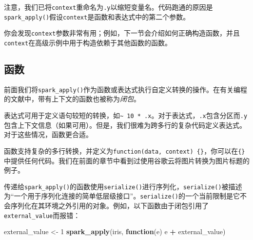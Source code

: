 \documentclass[
]{article}
\newenvironment{Shaded}{\begin{snugshade}}{\end{snugshade}}
\newcommand{\CommentTok}[1]{\textcolor[rgb]{0.56,0.35,0.01}{\textit{#1}}}
\newcommand{\ControlFlowTok}[1]{\textcolor[rgb]{0.13,0.29,0.53}{\textbf{#1}}}
\newcommand{\DataTypeTok}[1]{\textcolor[rgb]{0.13,0.29,0.53}{#1}}
\newcommand{\DecValTok}[1]{\textcolor[rgb]{0.00,0.00,0.81}{#1}}
\newcommand{\KeywordTok}[1]{\textcolor[rgb]{0.13,0.29,0.53}{\textbf{#1}}}
\newcommand{\NormalTok}[1]{#1}
\newcommand{\OperatorTok}[1]{\textcolor[rgb]{0.81,0.36,0.00}{\textbf{#1}}}
\newcommand{\StringTok}[1]{\textcolor[rgb]{0.31,0.60,0.02}{#1}}
\begin{document}
\begin{Shaded}
\end{Shaded}

注意，我们已将\texttt{context}重命名为\texttt{.y}以缩短变量名。代码跑通的原因是\texttt{spark\_apply()}假设\texttt{context}是函数和表达式中的第二个参数。

你会发现\texttt{context}参数非常有用；例如，下一节会介绍如何正确构造函数，并且\texttt{context}在高级示例中用于构造依赖于其他函数的函数。

\hypertarget{ux51fdux6570}{%
\subsection{函数}\label{ux51fdux6570}}

前面我们将\texttt{spark\_apply()}作为函数或表达式执行自定义转换的操作。在有关编程的文献中，带有上下文的函数也被称为\emph{闭包}。

表达式可用于定义语句较短的转换，如\texttt{\textasciitilde{}\ 10\ *\ .x}。对于表达式，\texttt{.x}包含分区而\texttt{.y}包含上下文信息（如果可用）。但是，我们很难为跨多行的复杂代码定义表达式。对于这些情况，函数更合适。

函数支持复杂的多行转换，并定义为\texttt{function(data,\ context)\ \{\}}，你可以在\texttt{\{\}}中提供任何代码。我们在前面的章节中看到过使用谷歌云将图片转换为图片标题的例子。

传递给\texttt{spark\_apply()}的函数使用\texttt{serialize()}进行序列化，\texttt{serialize()}被描述为``一个用于序列化连接的简单低层级接口''。\texttt{serialize()}的一个当前限制是它不会序列化在其环境之外引用的对象。例如，以下函数由于闭包引用了\texttt{external\_value}而报错：

\begin{Shaded}
\begin{Highlighting}[]
\NormalTok{external_value <-}\StringTok{ }\DecValTok{1}
\KeywordTok{spark_apply}\NormalTok{(iris, }\ControlFlowTok{function}\NormalTok{(e) e }\OperatorTok{+}\StringTok{ }\NormalTok{external_value)}
\end{Highlighting}
\end{Shaded}
\end{document}

